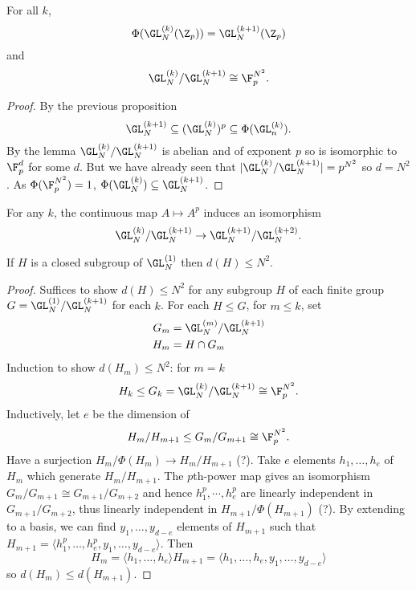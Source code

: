 \documentclass[a4paper]{article}
\begin{document}
\begin{proposition}
  For all \(k\),
  \[
    \Phi(\GL_N^{(k)}(\Z_p)) = \GL_N^{(k + 1)}(\Z_p)
  \]
  and
  \[
    \GL_N^{(k)}/\GL_N^{(k + 1)} \cong \F_p^{N^2}.
  \]
\end{proposition}

\begin{proof}
  By the previous proposition
  \[
    \GL_N^{(k + 1)} \subseteq (\GL_N^{(k)})^p \subseteq \Phi(\GL_n^{(k)}).
  \]
  By the lemma \(\GL_N^{(k)}/\GL_N^{(k + 1)}\) is abelian and of exponent \(p\) so is isomorphic to \(\F_p^d\) for some \(d\). But we have already seen that \(|\GL_N^{(k)}/\GL_N^{(k + 1)}| = p^{N^2}\) so \(d = N^2\). As \(\Phi(\F_p^{N^2}) = 1\), \(\Phi(\GL_N^{(k)}) \subseteq \GL_N^{(k + 1)}\).
\end{proof}

\begin{corollary}
  For any \(k\), the continuous map \(A \mapsto A^p\) induces an isomorphism
  \[
    \GL_N^{(k)}/\GL_N^{(k + 1)} \to \GL_N^{(k + 1)}/\GL_N^{(k + 2)}.
  \]
\end{corollary}

\begin{theorem}
  If \(H\) is a closed subgroup of \(\GL_N^{(1)}\) then \(d(H) \leq N^2\).
\end{theorem}

\begin{proof}
  Suffices to show \(d(H) \leq N^2\) for any subgroup \(H\) of each finite group \(G = \GL_N^{(1)}/\GL_N^{(k + 1)}\) for each \(k\). For each \(H \leq G\), for \(m \leq k\), set
  \begin{align*}
    G_m &= \GL_N^{(m)}/\GL_N^{(k + 1)} \\
    H_m &= H \cap G_m
  \end{align*}
  Induction to show \(d(H_m) \leq N^2\): for \(m = k\)
  \[
    H_k \leq G_k = \GL_N^{(k)}/\GL_N^{(k + 1)} \cong \F^{N^2}_p.
  \]
  Inductively, let \(e\) be the dimension of
  \[
    H_m/H_{m + 1} \leq G_m/G_{m + 1} \cong \F_p^{N^2}.
  \]
  Have a surjection \(H_m/\Phi(H_m) \to H_m/H_{m + 1}\) (?). Take \(e\) elements \(h_1, \dots, h_e\) of \(H_m\) which generate \(H_m/H_{m + 1}\). The \(p\)th-power map gives an isomorphism \(G_m/G_{m + 1} \cong G_{m + 1}/G_{m + 2}\) and hence \(h_1^p, \cdots, h_e^p\) are linearly independent in \(G_{m + 1}/G_{m + 2}\), thus linearly independent in \(H_{m + 1}/\Phi(H_{m + 1})\) (?). By extending to a basis, we can find \(y_1, \dots, y_{d - e}\) elements of \(H_{m + 1}\) such that \(H_{m + 1} = \langle h_1^p, \dots, h_e^p, y_1, \dots, y_{d - e} \rangle\). Then
  \[
    H_m = \langle h_1, \dots, h_e \rangle H_{m + 1} = \langle h_1, \dots, h_e, y_1, \dots, y_{d - e} \rangle
  \]
  so \(d(H_m) \leq d(H_{m + 1})\).
\end{proof}
\end{document}
